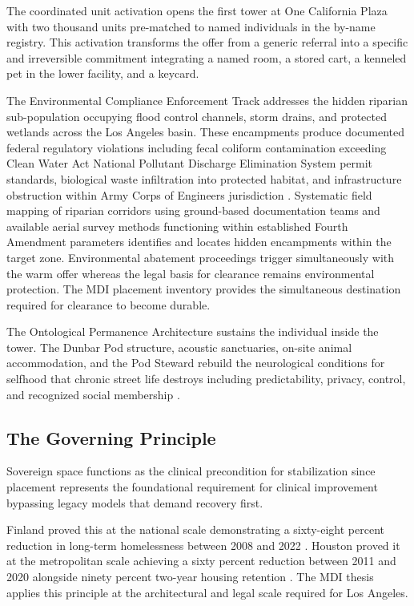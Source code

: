\documentclass[12pt, letterpaper]{article}
\begin{document}
The coordinated unit activation opens the first tower at One California Plaza with two thousand units pre-matched to named individuals in the by-name registry. This activation transforms the offer from a generic referral into a specific and irreversible commitment integrating a named room, a stored cart, a kenneled pet in the lower facility, and a keycard.

The Environmental Compliance Enforcement Track addresses the hidden riparian sub-population occupying flood control channels, storm drains, and protected wetlands across the Los Angeles basin. These encampments produce documented federal regulatory violations including fecal coliform contamination exceeding Clean Water Act National Pollutant Discharge Elimination System permit standards, biological waste infiltration into protected habitat, and infrastructure obstruction within Army Corps of Engineers jurisdiction \citep{clean_water_act_1972}. Systematic field mapping of riparian corridors using ground-based documentation teams and available aerial survey methods functioning within established Fourth Amendment parameters identifies and locates hidden encampments within the target zone. Environmental abatement proceedings trigger simultaneously with the warm offer whereas the legal basis for clearance remains environmental protection. The MDI placement inventory provides the simultaneous destination required for clearance to become durable.

The Ontological Permanence Architecture sustains the individual inside the tower. The Dunbar Pod structure, acoustic sanctuaries, on-site animal accommodation, and the Pod Steward rebuild the neurological conditions for selfhood that chronic street life destroys including predictability, privacy, control, and recognized social membership \citep{giddens_1991, laing_1960}.

\subsection{The Governing Principle}

Sovereign space functions as the clinical precondition for stabilization since placement represents the foundational requirement for clinical improvement bypassing legacy models that demand recovery first.

Finland proved this at the national scale demonstrating a sixty-eight percent reduction in long-term homelessness between 2008 and 2022 \citep{finland_housing_first_2023}. Houston proved it at the metropolitan scale achieving a sixty percent reduction between 2011 and 2020 alongside ninety percent two-year housing retention \citep{houston_way_home_2024}. The MDI thesis applies this principle at the architectural and legal scale required for Los Angeles.
\end{document}
